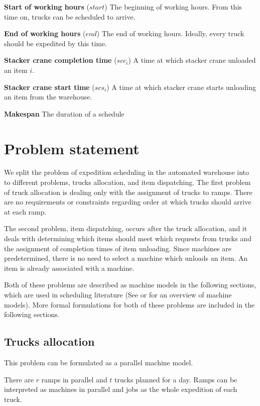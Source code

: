 \documentclass{ctuthesis}
\begin{document}
\noindent \textbf{Start of working hours} ($start$) The beginning of working hours. From this time on, trucks can be scheduled to arrive.

\noindent \textbf{End of working hours} ($end$) The end of working hours. Ideally, every truck should be expedited by this time.

\noindent \textbf{Stacker crane completion time} ($scc_i$) A time at which stacker crane unloaded an item $i$.

\noindent \textbf{Stacker crane start time} ($scs_i$) A time at which stacker crane starts unloading an item from the warehouse.

\noindent \textbf{Makespan} The duration of a schedule

\chapter{Problem statement}

 We split the problem of expedition scheduling in the automated warehouse into to different problems, trucks allocation, and item dispatching. The first problem of truck allocation is dealing only with the assignment of trucks to ramps. There are no requirements or constraints regarding order at which trucks should arrive at each ramp.
 
 The second problem, item dispatching, occurs after the truck allocation, and it deals with determining which items should meet which requests from trucks and the assignment of completion times of item unloading. Since machines are predetermined, there is no need to select a machine which unloads an item. An item is already associated with a machine.
 
Both of these problems are described as machine models in the following sections, which are used in scheduling literature (See \cite{pinedo} or \cite{bucker} for an overview of machine models). More formal formulations for both of these problems are included in the following sections.
 
 \section{Trucks allocation}
 \label{subsec:truckallocation}
This problem can be formulated as a parallel machine model.
 
 There are $r$ ramps in parallel and $t$ trucks planned for a day. Ramps can be interpreted as machines in parallel and jobs as the whole expedition of each truck. 
 
\end{document}
